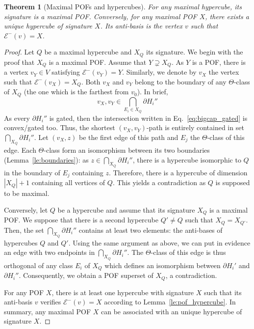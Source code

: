 \documentclass{article}
\newtheorem{theorem}{Theorem}
\newcommand{\card}[1]{\left| #1 \right|}
\begin{document}
\begin{theorem}[Maximal POFs and hypercubes]
For any maximal hypercube, its signature is a maximal POF.
Conversely, for any maximal POF $X$, there exists a unique hypercube of signature $X$. Its anti-basis is the vertex $v$ such that $\mathcal{E}^-(v) = X$. 
\label{th:maximal_pofs}
\end{theorem}
\begin{proof}
Let $Q$ be a maximal hypercube and $X_Q$ its signature. We begin with the proof that $X_Q$ is a maximal POF. Assume that $Y \supsetneq X_Q$. As $Y$ is a POF, there is a vertex $v_Y \in V$ satisfying $\mathcal{E}^-(v_Y) = Y$. Similarly, we denote by $v_X$ the vertex such that $\mathcal{E}^-(v_X) = X_Q$. Both $v_X$ and $v_Y$ belong to the boundary of any $\Theta$-class of $X_Q$ (the one which is the farthest from $v_0$). In brief, 
\begin{equation}v_X,v_Y \in \bigcap_{E_i \in X_Q} \partial H_i''
\label{eq:bigcap_gated}
\end{equation}
As every $\partial H_i''$ is gated, then the intersection written in Eq.~\eqref{eq:bigcap_gated} is convex/gated too. Thus, the shortest $(v_X,v_Y)$-path is entirely contained in set $\bigcap_{X_Q} \partial H_i''$. Let $(v_X,z)$ be the first edge of this path and $E_j$ the $\Theta$-class of this edge. Each $\Theta$-class form an isomorphism between its two boundaries (Lemma~\ref{le:boundaries}): as $z \in \bigcap_{X_Q} \partial H_i''$, there is a hypercube isomorphic to $Q$ in the boundary of $E_j$ containing $z$. Therefore, there is a hypercube of dimension $\card{X_Q}+1$ containing all vertices of $Q$. This yields a contradiction as $Q$ is supposed to be maximal.

Conversely, let $Q$ be a hypercube and assume that its signature $X_Q$ is a maximal POF. We suppose that there is a second hypercube $Q' \neq Q$ such that $X_Q = X_{Q'}$. Then, the set $\bigcap_{X_Q} \partial H_i''$ contains at least two elements: the anti-bases of hypercubes $Q$ and $Q'$. Using the same argument as above, we can put in evidence an edge with two endpoints in $\bigcap_{X_Q} \partial H_i''$. The $\Theta$-class of this edge is thus orthogonal of any class $E_i$ of $X_Q$ which defines an isomorphism between $\partial H_i'$ and $\partial H_i''$. Consequently, we obtain a POF superset of $X_Q$, a contradiction.

For any POF $X$, there is at least one hypercube with signature $X$ such that its anti-basis $v$ verifies $\mathcal{E}^-(v) = X$ according to Lemma~\ref{le:pof_hypercube}. In summary, any maximal POF $X$ can be associated with an unique hypercube of signature $X$.
\end{proof}
\end{document}
